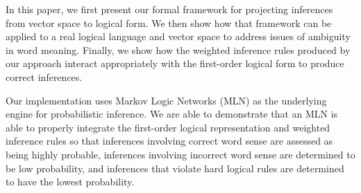 In this paper, we first present our formal framework for projecting inferences
from vector space to logical form.  We then show how that framework can be
applied to a real logical language and vector space to address issues of
ambiguity in word meaning.  Finally, we show how the weighted inference rules
produced by our approach interact appropriately with the first-order logical
form to produce correct inferences.

Our implementation uses Markov Logic Networks (MLN) \citep{richardson:mlj06} as
the underlying engine for probabilistic inference.  We are able to demonstrate
that an MLN is able to properly integrate the first-order logical representation
and weighted inference rules so that inferences involving correct word sense are
assessed as being highly probable, inferences involving incorrect word sense are
determined to be low probability, and inferences that violate hard logical rules
are determined to have the lowest probability.
